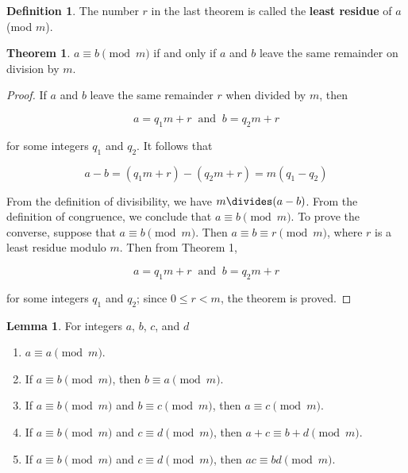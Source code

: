 \documentclass{article}
\theoremstyle{definition} %
\newtheorem{theorem}{Theorem}[section] %
\theoremstyle{definition}
\theoremstyle{definition}
\newtheorem{lemma}{Lemma}[section]
\theoremstyle{definition}
\newtheorem{definition}{Definition}[section]
\begin{document}
  \begin{definition}
    The number $r$ in the last theorem is called the \textbf{least residue} of $a$ (mod $m$).
  \end{definition}
  
  \begin{theorem}
    $a \equiv b \pmod{m}$ if and only if $a$ and $b$ leave the same remainder on division by $m$.
  \end{theorem}
  
  \begin{proof}
    If $a$ and $b$ leave the same remainder $r$ when divided by $m$, then
    
    \begin{equation*}
      a = q_1m + r \;\;\text{and}\;\; b = q_2m + r
    \end{equation*}
    
    for some integers $q_1$ and $q_2$. It follows that
    
    \begin{equation*}
      a - b = (q_1m + r) - (q_2m + r) = m(q_1 - q_2)
    \end{equation*}
    
    From the definition of divisibility, we have $m \divides (a - b)$. From the definition of congruence, we conclude that
    $a \equiv b \pmod{m}$. To prove the converse, suppose that $a \equiv b \pmod{m}$. Then
    $a \equiv b \equiv r \pmod{m}$, where $r$ is a least residue modulo $m$. Then from Theorem 1,
    
    \begin{equation*}
      a = q_1m + r \;\;\text{and}\;\; b = q_2m + r
    \end{equation*}
    
    for some integers $q_1$ and $q_2$; since $0 \leq r < m$, the theorem is proved.
  \end{proof}
  
  \begin{lemma}
    For integers $a$, $b$, $c$, and $d$
    \begin{enumerate}[label=\alph*)]
      \item $a \equiv a \pmod{m}$.
      \item If $a \equiv b \pmod{m}$, then $b \equiv a \pmod{m}$.
      \item If $a \equiv b \pmod{m}$ and $b \equiv c \pmod{m}$, then $a \equiv c \pmod{m}$.
      \item If $a \equiv b \pmod{m}$ and $c \equiv d \pmod{m}$, then $a + c \equiv b + d \pmod{m}$.
      \item If $a \equiv b \pmod{m}$ and $c \equiv d \pmod{m}$, then $ac \equiv bd \pmod{m}$.
    \end{enumerate}
  \end{lemma}
  
\end{document}
